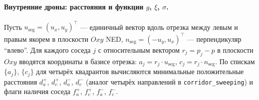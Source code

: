 \documentclass[12pt,a4paper]{article}
\begin{document}
\paragraph{Внутренние дроны: расстояния и функции $g$, $\xi$, $\sigma$.}
Пусть $u_{\mathrm{seg}} = (u_x, u_y)^\top$ --- единичный вектор вдоль отрезка между левым и правым якорем в плоскости $Oxy$ NED, $n_{\mathrm{seg}} = (-u_y, u_x)^\top$ --- перпендикуляр ``влево''. Для каждого соседа $j$ с относительным вектором $r_j = p_j - p$ в плоскости $Oxy$ вводятся координаты в базисе отрезка: $a_j = r_j \cdot u_{\mathrm{seg}}$, $c_j = r_j \cdot n_{\mathrm{seg}}$. По спискам $\{a_j\}$, $\{c_j\}$ для четырёх квадрантов вычисляются минимальные положительные расстояния $d_a^+$, $d_c^+$, $d_a^-$, $d_c^-$ (аналог четырёх направлений в \texttt{corridor\_sweeping}) и флаги наличия соседа $f_a^+$, $f_c^+$, $f_a^-$, $f_c^-$.
\end{document}

